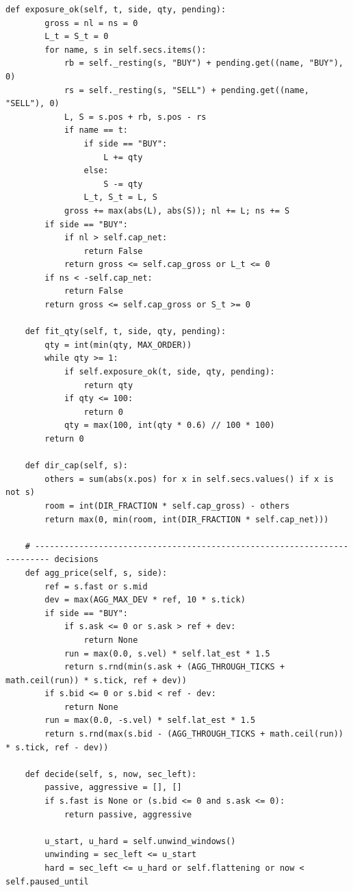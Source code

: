 \begin{lstlisting}[style=algocode]
    def exposure_ok(self, t, side, qty, pending):
        gross = nl = ns = 0
        L_t = S_t = 0
        for name, s in self.secs.items():
            rb = self._resting(s, "BUY") + pending.get((name, "BUY"), 0)
            rs = self._resting(s, "SELL") + pending.get((name, "SELL"), 0)
            L, S = s.pos + rb, s.pos - rs
            if name == t:
                if side == "BUY":
                    L += qty
                else:
                    S -= qty
                L_t, S_t = L, S
            gross += max(abs(L), abs(S)); nl += L; ns += S
        if side == "BUY":
            if nl > self.cap_net:
                return False
            return gross <= self.cap_gross or L_t <= 0
        if ns < -self.cap_net:
            return False
        return gross <= self.cap_gross or S_t >= 0

    def fit_qty(self, t, side, qty, pending):
        qty = int(min(qty, MAX_ORDER))
        while qty >= 1:
            if self.exposure_ok(t, side, qty, pending):
                return qty
            if qty <= 100:
                return 0
            qty = max(100, int(qty * 0.6) // 100 * 100)
        return 0

    def dir_cap(self, s):
        others = sum(abs(x.pos) for x in self.secs.values() if x is not s)
        room = int(DIR_FRACTION * self.cap_gross) - others
        return max(0, min(room, int(DIR_FRACTION * self.cap_net)))

    # ------------------------------------------------------------------------- decisions
    def agg_price(self, s, side):
        ref = s.fast or s.mid
        dev = max(AGG_MAX_DEV * ref, 10 * s.tick)
        if side == "BUY":
            if s.ask <= 0 or s.ask > ref + dev:
                return None
            run = max(0.0, s.vel) * self.lat_est * 1.5
            return s.rnd(min(s.ask + (AGG_THROUGH_TICKS + math.ceil(run)) * s.tick, ref + dev))
        if s.bid <= 0 or s.bid < ref - dev:
            return None
        run = max(0.0, -s.vel) * self.lat_est * 1.5
        return s.rnd(max(s.bid - (AGG_THROUGH_TICKS + math.ceil(run)) * s.tick, ref - dev))

    def decide(self, s, now, sec_left):
        passive, aggressive = [], []
        if s.fast is None or (s.bid <= 0 and s.ask <= 0):
            return passive, aggressive

        u_start, u_hard = self.unwind_windows()
        unwinding = sec_left <= u_start
        hard = sec_left <= u_hard or self.flattening or now < self.paused_until


\end{lstlisting}
